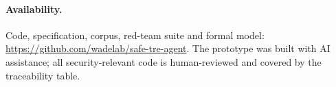 \documentclass[11pt,a4paper]{article}
\begin{document}
\paragraph{Availability.} Code, specification, corpus, red-team suite and formal
model: \url{https://github.com/wadelab/safe-tre-agent}. The prototype was built
with AI assistance; all security-relevant code is human-reviewed and covered by
the traceability table.



\end{document}
